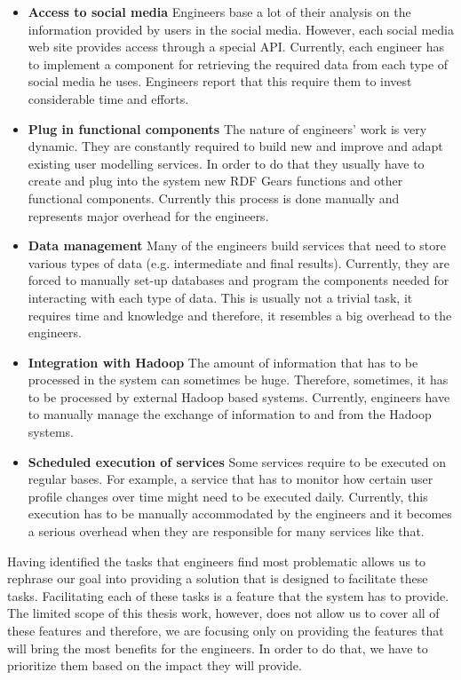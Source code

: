 \begin{itemize}

\item \textbf{Access to social media}
Engineers base a lot of their analysis on the information provided by users in the social media. However, each social media web site provides access through a special API. Currently, each engineer has to implement a component for retrieving the required data from each type of social media he uses. Engineers report that this require them to invest considerable time and efforts.

\item \textbf{Plug in functional components}
The nature of engineers' work is very dynamic. They are constantly required to build new and improve and adapt existing user modelling services. In order to do that they usually have to create and plug into the system new RDF Gears functions and other functional components. Currently this process is done manually and represents major overhead for the engineers.

\item \textbf{Data management} 
Many of the engineers build services that need to store various types of data (e.g. intermediate and final results). Currently, they are forced to manually set-up databases and program the components needed for interacting with each type of data. This is usually not a trivial task, it requires time and knowledge and therefore, it resembles a big overhead to the engineers.

 
\item \textbf{Integration with Hadoop}
The amount of information that has to be processed in the system can sometimes be huge. Therefore, sometimes, it has to be processed by external Hadoop based systems. Currently, engineers have to manually manage the exchange of information to and from the Hadoop systems.

\item \textbf{Scheduled execution of services}
Some services require to be executed on regular bases. For example, a service that has to monitor how certain user profile changes over time might need to be executed daily. Currently, this execution has to be manually accommodated by the engineers and it becomes a serious overhead when they are responsible for many services like that. 

\end{itemize}

Having identified the tasks that engineers find most problematic allows us to rephrase our goal into providing a solution that is designed to facilitate these tasks. Facilitating each of these tasks is a feature that the system has to provide. The limited scope of this thesis work, however, does not allow us to cover all of these features and therefore, we are focusing only on providing the features that will bring the most benefits for the engineers. In order to do that, we have to prioritize them based on the impact they will provide. 

